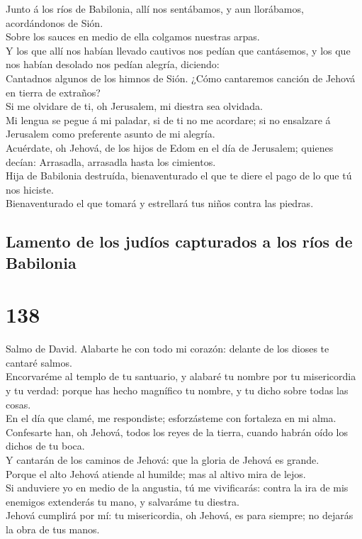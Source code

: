 Junto á los ríos de Babilonia, allí nos sentábamos, y aun
llorábamos, acordándonos de Sión.\\
 Sobre los sauces en medio de ella colgamos nuestras
arpas.\\
 Y los que allí nos habían llevado cautivos nos pedían que
cantásemos, y los que nos habían desolado nos pedían alegría,
diciendo:\\
 Cantadnos algunos de los himnos de Sión. ¿Cómo cantaremos
canción de Jehová en tierra de extraños?\\
 Si me olvidare de ti, oh Jerusalem, mi diestra sea
olvidada.\\
 Mi lengua se pegue á mi paladar, si de ti no me acordare;
si no ensalzare á Jerusalem como preferente asunto de mi alegría.\\
 Acuérdate, oh Jehová, de los hijos de Edom en el día de
Jerusalem; quienes decían: Arrasadla, arrasadla hasta los cimientos.\\
 Hija de Babilonia destruída, bienaventurado el que te
diere el pago de lo que tú nos hiciste.\\
 Bienaventurado el que tomará y estrellará tus niños
contra las piedras.

\hypertarget{lamento-de-los-juduxedos-capturados-a-los-ruxedos-de-babilonia-1}{%
\subsection{Lamento de los judíos capturados a los ríos de
Babilonia}\label{lamento-de-los-juduxedos-capturados-a-los-ruxedos-de-babilonia-1}}

\hypertarget{section-137}{%
\section{138}\label{section-137}}

 Salmo de David. Alabarte he con todo mi corazón: delante
de los dioses te cantaré salmos.\\
 Encorvaréme al templo de tu santuario, y alabaré tu
nombre por tu misericordia y tu verdad: porque has hecho magnífico tu
nombre, y tu dicho sobre todas las cosas.\\
 En el día que clamé, me respondiste; esforzásteme con
fortaleza en mi alma.\\
 Confesarte han, oh Jehová, todos los reyes de la tierra,
cuando habrán oído los dichos de tu boca.\\
 Y cantarán de los caminos de Jehová: que la gloria de
Jehová es grande.\\
 Porque el alto Jehová atiende al humilde; mas al altivo
mira de lejos.\\
 Si anduviere yo en medio de la angustia, tú me
vivificarás: contra la ira de mis enemigos extenderás tu mano, y
salvaráme tu diestra.\\
 Jehová cumplirá por mí: tu misericordia, oh Jehová, es
para siempre; no dejarás la obra de tus manos.


